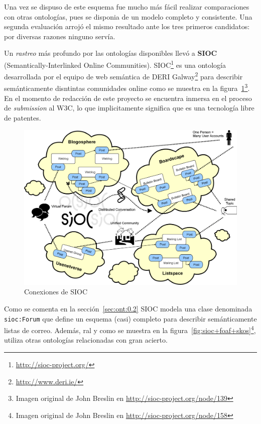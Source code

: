 Una vez se dispuso de este esquema fue mucho más fácil realizar comparaciones
con otras ontologías, pues se disponia de un modelo completo y consistente. Una 
segunda evaluación arrojó el mismo resultado ante los tres primeros candidatos:
por diversas razones ninguno servía.

Un \emph{rastreo} más profundo por las ontologías disponibles llevó a 
\textbf{SIOC}\cite{Breslin2005} (Semantically-Interlinked Online Communities). 
SIOC\footnote{\url{http://sioc-project.org/}} es una ontología desarrollada 
por el equipo de web semántica de DERI Galway\footnote{\url{http://www.deri.ie/}} 
para describir semánticamente disntintas comunidades online como se muestra en
la figura~\ref{fig:siocCloud}\footnote{Imagen original de John Breslin en 
\url{http://sioc-project.org/node/139}}. En el momento de redacción
de este proyecto se encuentra inmersa en el proceso de \emph{submission} al
W3C, lo que implicitamente significa que es una tecnología libre de patentes.

\begin{figure}[H]
	\centering
	\includegraphics[width=12cm]{images/sioc-clouds.png}
	\caption{Conexiones de SIOC}
	\label{fig:siocCloud}
\end{figure}

Como se comenta en la sección~\ref{sec:ont:0.2} SIOC modela una clase denominada
\texttt{sioc:Forum} que define un esquema (casi) completo para describir
semánticamente listas de correo. Además, ral y como se muestra en la 
figura~\ref{fig:sioc+foaf+skos}\footnote{Imagen original de John Breslin en 
\url{http://sioc-project.org/node/158}}, utiliza otras ontologías relacionadas
con gran acierto.

